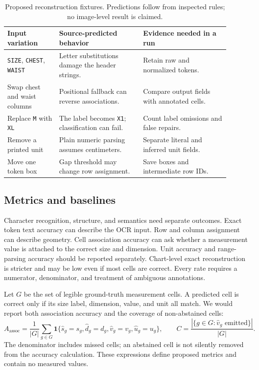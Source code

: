 \documentclass[10pt,letterpaper]{article}
\begin{document}
\begin{table}[H]
\centering\small
\caption{Proposed reconstruction fixtures. Predictions follow from inspected rules; no image-level result is claimed.}
\label{tab:ocr-fixtures}
\begin{tabular}{@{}>{\raggedright\arraybackslash}p{0.21\linewidth}>{\raggedright\arraybackslash}p{0.34\linewidth}>{\raggedright\arraybackslash}p{0.35\linewidth}@{}}
\toprule
Input variation & Source-predicted behavior & Evidence needed in a run \\
\midrule
\texttt{SIZE}, \texttt{CHEST}, \texttt{WAIST} & Letter substitutions damage the header strings. & Retain raw and normalized tokens. \\
Swap chest and waist columns & Positional fallback can reverse associations. & Compare output fields with annotated cells. \\
Replace \texttt{M} with \texttt{XL} & The label becomes \texttt{X1}; classification can fail. & Count label omissions and false repairs. \\
Remove a printed unit & Plain numeric parsing assumes centimeters. & Separate literal and inferred unit fields. \\
Move one token box & Gap threshold may change row assignment. & Save boxes and intermediate row IDs. \\
\bottomrule
\end{tabular}
\end{table}


\subsection{Metrics and baselines}

Character recognition, structure, and semantics need separate outcomes. Exact token text accuracy can describe the OCR input. Row and column assignment can describe geometry. Cell association accuracy can ask whether a measurement value is attached to the correct size and dimension. Unit accuracy and range-parsing accuracy should be reported separately. Chart-level exact reconstruction is stricter and may be low even if most cells are correct. Every rate requires a numerator, denominator, and treatment of ambiguous annotations.


Let $G$ be the set of legible ground-truth measurement cells. A predicted
cell is correct only if its size label, dimension, value, and unit all match.
We would report both association accuracy and the coverage of non-abstained
cells:
\begin{equation}
A_{\mathrm{assoc}}=\frac{1}{|G|}\sum_{g\in G}
\mathbf{1}\{\hat{s}_g=s_g,\hat{d}_g=d_g,\hat{v}_g=v_g,\hat{u}_g=u_g\},
\qquad
C=\frac{|\{g\in G:\hat{v}_g\text{ emitted}\}|}{|G|}.
\end{equation}
The denominator includes missed cells; an abstained cell is not silently
removed from the accuracy calculation. These expressions define proposed
metrics and contain no measured values.
\end{document}
